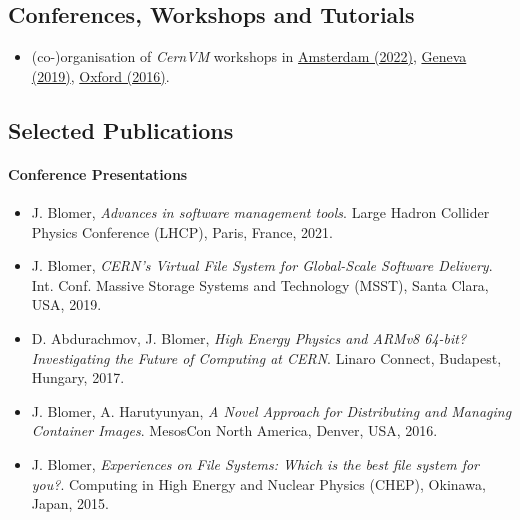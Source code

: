 \subsection*{Conferences, Workshops and Tutorials}

\begin{itemize}

\item[] (co-)organisation of \emph{CernVM} workshops in
    \href{https://indico.cern.ch/event/1079490}{Amsterdam (2022)},
        \href{https://indico.cern.ch/event/757415/}{Geneva (2019)},
        \href{https://indico.cern.ch/event/469775/}{Oxford (2016)}.

\end{itemize}

\subsection*{Selected Publications}

\paragraph{Conference Presentations}

\begin{itemize}

\item[] J. Blomer, \emph{Advances in software management tools}. Large Hadron Collider Physics Conference (LHCP), Paris, France, 2021.

\item[] J. Blomer, \emph{CERN’s Virtual File System for Global-Scale Software Delivery}. Int. Conf. Massive Storage Systems and Technology (MSST), Santa Clara, USA, 2019.

\item[] D. Abdurachmov, J. Blomer,
\emph{High Energy Physics and ARMv8 64-bit? Investigating the Future of Computing at CERN}.
Linaro Connect, Budapest, Hungary, 2017.

\item[] J. Blomer, A. Harutyunyan, \emph{A Novel Approach for Distributing and Managing Container Images}. MesosCon North America, Denver, USA, 2016.

\item[] J. Blomer, \emph{Experiences on File Systems: Which is the best file system for you?}. Computing in High Energy and Nuclear Physics (CHEP), Okinawa, Japan, 2015.

\end{itemize}


